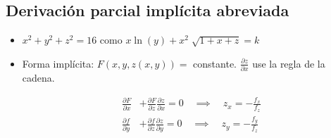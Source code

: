 \subsection{Derivación parcial implícita abreviada}
\begin{itemize}
    \item $x^2+y^2+z^2=16$ como $x \ln (y) + x^2 \sqrt[]{1+x+z} = k$
    \item Forma implícita: $F(x,y,z(x,y))=$ constante. $\frac{\partial z}{\partial x} $ use la regla de la cadena.
        \begin{center}
           \begin{align*}
               \frac{\partial F}{\partial x} &+ \frac{\partial F}{\partial z} \frac{\partial z}{\partial x}  = 0  \quad \implies \quad z_x= - \frac{f_x}{f_z} \\ 
               \frac{\partial f}{\partial y} &+ \frac{\partial f}{\partial z} \frac{\partial z}{\partial y} = 0 \quad \implies  \quad z_y = - \frac{f_y}{f_z} \\ 
           \end{align*}
        \end{center}
\end{itemize}



